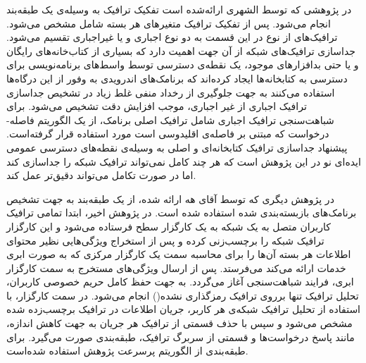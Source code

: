 در پژوهشی که توسط الشهری ارائه‌شده است تفکیک ترافیک به وسیله‌ی یک طبقه‌بند انجام می‌‌شود. پس از تفکیک ترافیک متغیر‌های هر بسته شامل  مشخص‌ می‌شود. ترافیک‌های از نوع  در این قسمت به دو نوع اجباری و یا غیراجباری تقسیم می‌شود. جداسازی ترافیک‌های شبکه از آن‌ جهت اهمیت دارد که بسیاری از کتاب‌خانه‌های رایگان و یا حتی بدافزار‌های موجود، یک نقطه‌ی دسترسی توسط واسط‌های برنامه‌نویسی برای دسترسی به کتابخانه‌ها ایجاد کرده‌اند که برنامک‌های اندرویدی به وفور از این درگاه‌ها استفاده می‌کنند به جهت جلوگیری از رخداد منفی غلط زیاد در تشخیص جداسازی ترافیک اجباری از غیر اجباری، موجب افزایش دقت تشخیص می‌شود. برای شباهت‌سنجی ترافیک اجباری شامل ترافیک اصلی برنامک، از یک الگوریتم فاصله‌-درخواست که مبتنی بر فاصله‌ی اقلیدوسی است مورد استفاده قرار گرفته‌است. پیشنهاد جداسازی ترافیک کتابخانه‌ای و اصلی به وسیله‌ی نقطه‌های دسترسی عمومی ایده‌ای نو در این پژوهش است که هر چند کامل نمی‌تواند ترافیک‌ شبکه را جداسازی کند اما در صورت تکامل می‌تواند دقیق‌تر عمل کند. 

در پژوهش دیگری که توسط آقای هه ارا‌ئه‌ شده‌، از یک طبقه‌بند به جهت تشخیص برنامک‌های بازبسته‌بندی شده استفاده شده است. در پژوهش اخیر، ابتدا تمامی ترافیک کاربران متصل به یک شبکه به یک کارگزار سطح فرستاده می‌شود و این کارگزار ترافیک شبکه را برچسب‌زنی کرده و پس از استخراج ویژگی‌هایی نظیر محتوای اطلاعات هر بسته آن‌ها را برای محاسبه سمت یک کارگزار مرکزی که به صورت ابری خدمات ارائه می‌کند می‌فرستد. پس از ارسال ویژگی‌های مستخرج به سمت کارگزار ابری، فرایند شباهت‌سنجی آغاز می‌گردد. به جهت حفظ کامل حریم خصوصی کاربران، تحلیل ترافیک تنها برروی ترافیک رمز‌گذاری نشده() انجام می‌شود. در سمت کارگزار، با استفاده از تحلیل ترافیک شبکه‌‌ی هر کاربر، جریان اطلاعات در ترافیک برچسب‌زده شده مشخص می‌شود و سپس با حذف قسمتی از ترافیک هر جریان به جهت کاهش اندازه، مانند پاسخ درخواست‌ها و قسمتی از سربرگ ترافیک، طبقه‌بندی صورت می‌گیرد. برای طبقه‌بندی از الگوریتم پرسرعت پژوهش  استفاده شده‌است. 




